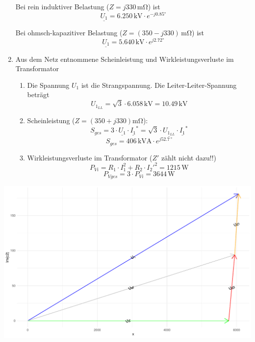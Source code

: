\documentclass[a4paper]{article}
\newcommand{\complex}[1]{\underline{#1}}
\begin{document}
\begin{enumerate}
    Bei rein induktiver Belastung ($Z = j330 \, \si{\milli\ohm}$) ist
    \[\complex{U_{1}} = 6.250 \, \si{\kilo\volt} \cdot e^{-j 0.85 \si{\degree}}\]

    Bei ohmsch-kapazitiver Belastung ($Z = (350 - j 330) \, \si{\milli\ohm}$) ist
    \[\complex{U_1} = 5.640 \, \si{\kilo\volt} \cdot e^{j 2.72 \si{\degree}}\]

    \item Aus dem Netz entnommene Scheinleistung und Wirkleistungsverluste im Transformator

    \begin{enumerate}

      \item Die Spannung $U_{1}$ ist die Strangspannung. Die Leiter-Leiter-Spannung beträgt
        \[U_{1_{LL}} = \sqrt{3} \cdot 6.058 \, \si{\kilo\volt} = 10.49 \, \si{\kilo\volt}\]
        
        \item Scheinleistung ($Z = (350 + j 330)\si{\milli\ohm}$):
              \[S_{ges} = 3 \cdot \complex{U_{1}} \cdot \complex{I_{1}}^{*} = \sqrt{3} \cdot \complex{U_{1_{LL}}} \cdot \complex{I_{1}}^{*}\]
        \[S_{ges} = 406 \, \si{\kilo\volt\ampere} \cdot e^{j 52.7 \, \si{\degree}}\]

        \item Wirkleistungsverluste im Transformator ($Z'$ zählt nicht dazu!!)
        \[P_{Vi}   = R_{1} \cdot I_{1}^{2} + R_{2} \cdot I_{2}'^{2} = 1215 \, \si{\watt}\]
        \[P_{Vges} = 3 \cdot P_{Vi} = 3644 \, \si{\watt}\]
        
    
    \end{enumerate}

\end{enumerate}

\includegraphics[width=\textwidth]{zeigerbild.pdf}
\end{document}
